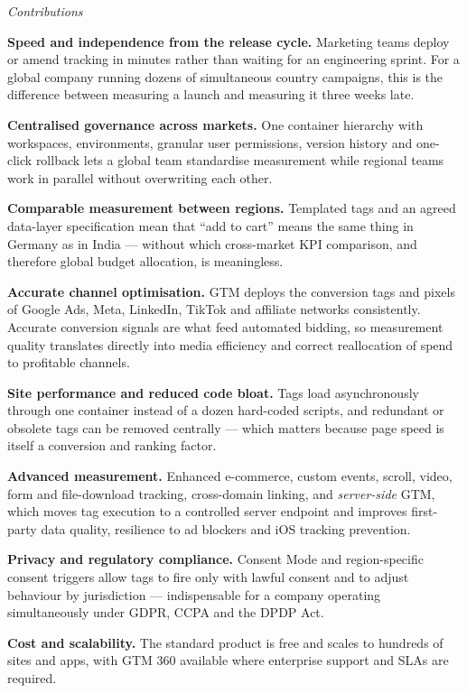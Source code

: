 \begin{qlist}
\textit{Contributions}
\begin{apts}
\item \textbf{Speed and independence from the release cycle.} Marketing teams
      deploy or amend tracking in minutes rather than waiting for an
      engineering sprint. For a global company running dozens of simultaneous
      country campaigns, this is the difference between measuring a launch and
      measuring it three weeks late.
\item \textbf{Centralised governance across markets.} One container hierarchy
      with workspaces, environments, granular user permissions, version history
      and one-click rollback lets a global team standardise measurement while
      regional teams work in parallel without overwriting each other.
\item \textbf{Comparable measurement between regions.} Templated tags and an
      agreed data-layer specification mean that ``add to cart'' means the same
      thing in Germany as in India --- without which cross-market KPI
      comparison, and therefore global budget allocation, is meaningless.
\item \textbf{Accurate channel optimisation.} GTM deploys the conversion tags
      and pixels of Google Ads, Meta, LinkedIn, TikTok and affiliate networks
      consistently. Accurate conversion signals are what feed automated
      bidding, so measurement quality translates directly into media
      efficiency and correct reallocation of spend to profitable channels.
\item \textbf{Site performance and reduced code bloat.} Tags load
      asynchronously through one container instead of a dozen hard-coded
      scripts, and redundant or obsolete tags can be removed centrally ---
      which matters because page speed is itself a conversion and ranking
      factor.
\item \textbf{Advanced measurement.} Enhanced e-commerce, custom events,
      scroll, video, form and file-download tracking, cross-domain linking, and
      \emph{server-side} GTM, which moves tag execution to a controlled server
      endpoint and improves first-party data quality, resilience to ad blockers
      and iOS tracking prevention.
\item \textbf{Privacy and regulatory compliance.} Consent Mode and
      region-specific consent triggers allow tags to fire only with lawful
      consent and to adjust behaviour by jurisdiction --- indispensable for a
      company operating simultaneously under GDPR, CCPA and the DPDP Act.
\item \textbf{Cost and scalability.} The standard product is free and scales to
      hundreds of sites and apps, with GTM 360 available where enterprise
      support and SLAs are required.
\end{apts}


\end{qlist}
